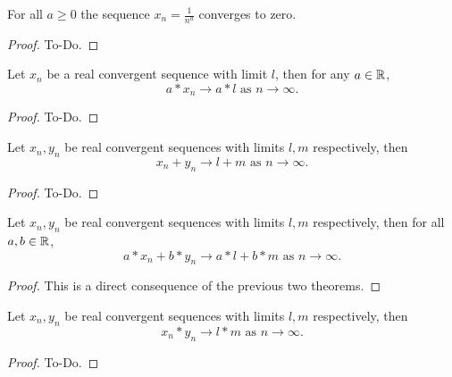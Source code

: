 \begin{theorem}\label{thm:seq_inv_conv}
     \leanok
    For all $a \geq 0$ the sequence $x_n = \frac{1}{n ^ a}$ converges to zero.
\end{theorem}
\begin{proof}
    To-Do.
\end{proof}

\begin{theorem}\label{thm:seq_COLT_scalar_mult}
     \leanok
    Let $x_n$ be a real convergent sequence with limit $l$,
    then for any $a \in \mathbb{R}$,
    \[
    a * x_n \to a * l \text{ as } n \to \infty.
    \]
\end{theorem}
\begin{proof}
    To-Do.
\end{proof}

\begin{theorem}\label{thm:seq_COLT_add}
     \leanok
    Let $x_n, y_n$ be real convergent sequences with limits $l, m$ respectively,
    then
    \[
    x_n + y_n \to l + m \text{ as } n \to \infty.
    \]
\end{theorem}
\begin{proof}
    To-Do.
\end{proof}

\begin{lemma}\label{lem:seq_COLT_linear}
     \leanok
    Let $x_n, y_n$ be real convergent sequences with limits $l, m$ respectively,
    then for all $a, b \in \mathbb{R}$,
    \[
    a * x_n + b * y_n \to a * l + b * m \text{ as } n \to \infty.
    \]
\end{lemma}
\begin{proof}
    This is a direct consequence of the previous two theorems.
\end{proof}

\begin{theorem}\label{thm:seq_COLT_mult}
     \leanok
    Let $x_n, y_n$ be real convergent sequences with limits $l, m$ respectively,
    then
    \[
    x_n * y_n \to l * m \text{ as } n \to \infty.
    \]
\end{theorem}
\begin{proof}
    To-Do.
\end{proof}


